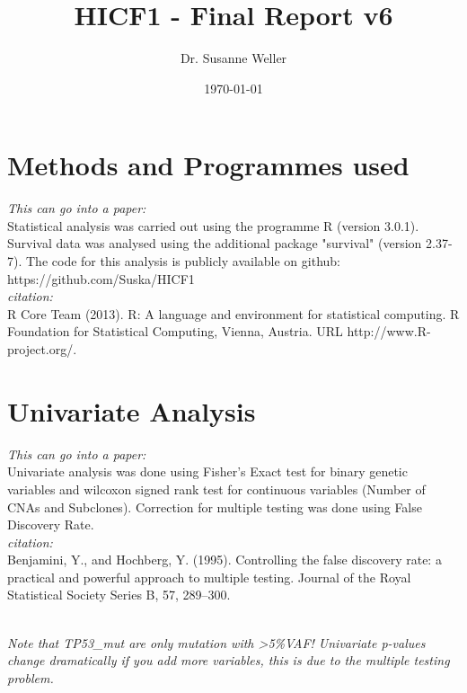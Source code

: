 \documentclass[a4paper,11pt]{article}
\title{HICF1 -  Final Report v6}
\author{Dr. Susanne Weller}
\date{\today}
\begin{document}


\maketitle
\tableofcontents

\section{Methods and Programmes used}
\emph{This can go into a paper:}\\
Statistical analysis was carried out using the programme R (version 3.0.1). Survival data was analysed using the additional package "survival" (version 2.37-7). The code for this analysis is publicly available on github:
https://github.com/Suska/HICF1\\
\emph{citation:}\\
R Core Team (2013). R: A language and environment for statistical computing. R Foundation for Statistical Computing, Vienna, Austria. URL http://www.R-project.org/.

\section{Univariate Analysis}
\emph{This can go into a paper:}\\
Univariate analysis was done using Fisher's Exact test for binary genetic variables and wilcoxon signed rank test for continuous variables (Number of CNAs and Subclones). Correction for multiple testing was done using False Discovery Rate.\\
\emph{citation:}\\
Benjamini, Y., and Hochberg, Y. (1995). Controlling the false discovery rate: a practical and powerful approach to multiple testing. Journal of the Royal Statistical Society Series B, 57, 289–300.

\emph{\\Note that TP53\_mut are only mutation with >5\%VAF! Univariate p-values change dramatically if you add more variables, this is due to the multiple testing problem.}
\end{document}
